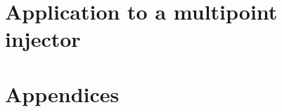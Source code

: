\documentclass[twoside]{report}
\begin{document}
%
%

\newpage
%
%

\part{Application to a multipoint injector}

\newpage 

%
\newpage

%

%
\newpage



%
%


\fancyhead[LO]{}
\nocite{*}


\newpage


\part{Appendices}
\begin{appendices}

\newpage
\newpage

\newpage

\newpage
\end{appendices}
\end{document}
